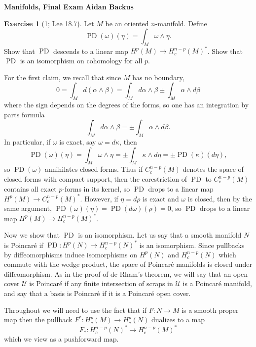 \documentclass[10pt]{article}
\DeclareMathOperator{\PD}{PD}
\theoremstyle{definition}
\newtheorem{exer}{Exercise}
\begin{document}
\noindent
\large\textbf{Manifolds, Final Exam} \hfill \textbf{Aidan Backus} \\


\begin{exer}[1; Lee 18.7]
Let $M$ be an oriented $n$-manifold. Define
$$\PD(\omega)(\eta) = \int_M \omega \wedge \eta.$$
Show that $\PD$ descends to a linear map $H^p(M) \to H^{n-p}_c(M)^*$.
Show that $\PD$ is an isomorphism on cohomology for all $p$.
\end{exer}

For the first claim, we recall that since $M$ has no boundary,
$$0 = \int_M d(\alpha \wedge \beta) = \int_M d\alpha \wedge \beta \pm \int_M \alpha \wedge d\beta$$
where the sign depends on the degrees of the forms, so one has an integration by parts formula
$$\int_M d\alpha \wedge \beta = \pm \int_M \alpha \wedge d\beta.$$
In particular, if $\omega$ is exact, say $\omega = d\kappa$, then
$$\PD(\omega)(\eta) = \int_M \omega \wedge \eta = \pm \int_M \kappa \wedge d\eta = \pm \PD(\kappa)(d\eta),$$
so $\PD(\omega)$ annihilates closed forms.
Thus if $C^{n-p}_c(M)$ denotes the space of closed forms with compact support, then the corestriction of $\PD$ to $C^{n-p}_c(M)$ contains all exact $p$-forms in its kernel, so $\PD$ drops to a linear map $H^p(M) \to C^{n-p}_c(M)^*$.
However, if $\eta = d\rho$ is exact and $\omega$ is closed, then by the same argument, $\PD(\omega)(\eta) = \PD(d\omega)(\rho) = 0$, so $\PD$ drops to a linear map $H^p(M) \to H^{n-p}_c(M)^*$.

Now we show that $\PD$ is an isomorphism.
Let us say that a smooth manifold $N$ is Poincar\'e if $\PD: H^p(N) \to H^{n-p}_c(N)^*$ is an isomorphism.
Since pullbacks by diffeomorphisms induce isomorphisms on $H^p(N)$ and $H^{n-p}_c(N)$ which commute with the wedge product, the space of Poincar\'e manifolds is closed under diffeomorphism.
As in the proof of de Rham's theorem, we will say that an open cover $\mathcal U$ is Poincar\'e if any finite intersection of scraps in $\mathcal U$ is a Poincar\'e manifold, and say that a basis is Poincar\'e if it is a Poincar\'e open cover.

Throughout we will need to use the fact that if $F: N \to M$ is a smooth proper map then the pullback $F^*: H^p_c(M) \to H^p_c(N)$ dualizes to a map
$$F_*: H^{n-p}_c(N)^* \to H^{n-p}_c(M)^*$$
which we view as a pushforward map.
\end{document}
